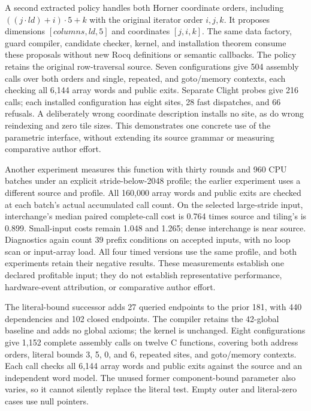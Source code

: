 A second extracted policy handles both Horner coordinate orders, including
$((j\cdot\mathit{ld})+i)\cdot5+k$ with the original iterator order
$i,j,k$. It proposes dimensions $[\mathit{columns},\mathit{ld},5]$ and coordinates
$[j,i,k]$. The same data factory, guard compiler, candidate checker, kernel,
and installation theorem consume these proposals without new Rocq definitions
or semantic callbacks. The policy retains the original row-traversal source.
Seven configurations give 504 assembly calls over both orders and single,
repeated, and goto/memory contexts, each checking all 6,144 array words and
public exits. Separate Clight probes give 216 calls; each installed
configuration has eight sites, 28 fast dispatches, and 66 refusals. A deliberately
wrong coordinate description installs no site, as do wrong reindexing and zero
tile sizes. This demonstrates one concrete use of the parametric interface,
without extending its source grammar or measuring comparative author effort.

Another experiment measures this function with thirty rounds and 960 CPU
batches under an explicit stride-below-2048 profile; the earlier experiment
uses a different source and profile. All 160,000 array words and public exits
are checked at each batch's actual accumulated call count. On the selected
large-stride input, interchange's median paired complete-call cost is 0.764
times source and tiling's is 0.899. Small-input costs remain 1.048 and 1.265;
dense interchange is near source. Diagnostics again count 39 prefix conditions
on accepted inputs, with no loop scan or input-array load. All four timed
versions use the same profile, and both experiments retain their negative
results. These measurements establish one declared profitable input; they do
not establish representative performance, hardware-event attribution, or
comparative author effort.

The literal-bound successor adds 27 queried endpoints to the prior 181,
with 440 dependencies and 102 closed endpoints. The compiler retains the
42-global baseline and adds no global axioms; the kernel is unchanged.
Eight configurations give 1,152 complete assembly calls on twelve C functions,
covering both address orders, literal bounds 3, 5, 0, and 6, repeated sites,
and goto/memory contexts. Each call checks all 6,144 array words and public
exits against the source and an independent word model. The unused former
component-bound parameter also varies, so it cannot silently replace the
literal test. Empty outer and literal-zero cases use null pointers.

